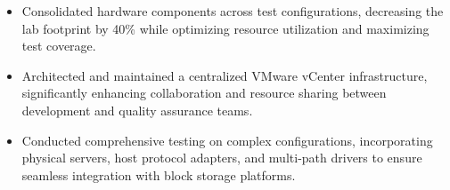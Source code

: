 \documentclass[10pt,letterpaper]{article}       %
\begin{document}
\begin{itemize}
  \item Consolidated hardware components across test configurations, decreasing the lab footprint by 40\% while optimizing resource utilization and maximizing test coverage.
  \item Architected and maintained a centralized VMware vCenter infrastructure, significantly enhancing collaboration and resource sharing between development and quality assurance teams.
  \item Conducted comprehensive testing on complex configurations, incorporating physical servers, host protocol adapters, and multi-path drivers to ensure seamless integration with block storage platforms.
\end{itemize}



\end{document}
